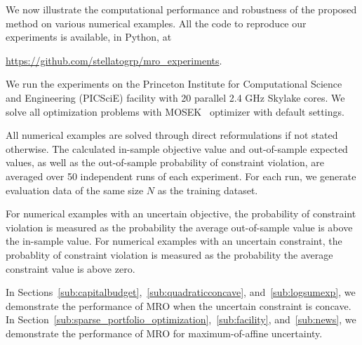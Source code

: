 \documentclass[12pt]{article}
\newcommand{\citep}{\cite}
\theoremstyle{thmstyleone}%
\theoremstyle{thmstyletwo}%
\theoremstyle{thmstylethree}%
\newcommand{\reviewChanges}{}
\begin{document}
We now illustrate the computational performance and robustness of the proposed method on various numerical examples.
All the code to reproduce our experiments is available, \reviewChanges{in Python}, at
\begin{center}
	\url{https://github.com/stellatogrp/mro_experiments}.
\end{center}
We run the experiments on the Princeton Institute for Computational Science and Engineering (PICSciE) facility with 20 parallel 2.4 GHz Skylake cores.
We solve all optimization problems with MOSEK~\citep{mosek} optimizer with default settings.

\reviewChanges{
All numerical examples are solved through direct reformulations if not stated otherwise.
The calculated in-sample objective value and out-of-sample expected values, as well as the out-of-sample probability of constraint violation, are averaged over 50 independent runs of each experiment. For each run, we generate evaluation data of the same size $N$ as the training dataset.}

\reviewChanges{
For numerical examples with an uncertain objective, the probability of constraint violation is measured as the probability the average out-of-sample value is above the in-sample value.
For numerical examples with an uncertain constraint, the probablity of constraint violation is measured as the probability the average constraint value is above zero.}

\reviewChanges{In Sections~\ref{sub:capitalbudget},~\ref{sub:quadraticconcave}, and~\ref{sub:logsumexp}, we demonstrate the performance of \gls{MRO} when the uncertain constraint is concave. In Section~\ref{sub:sparse_portfolio_optimization},~\ref{sub:facility}, and~\ref{sub:news}, we demonstrate the performance of \gls{MRO} for maximum-of-affine uncertainty. }
\end{document}
